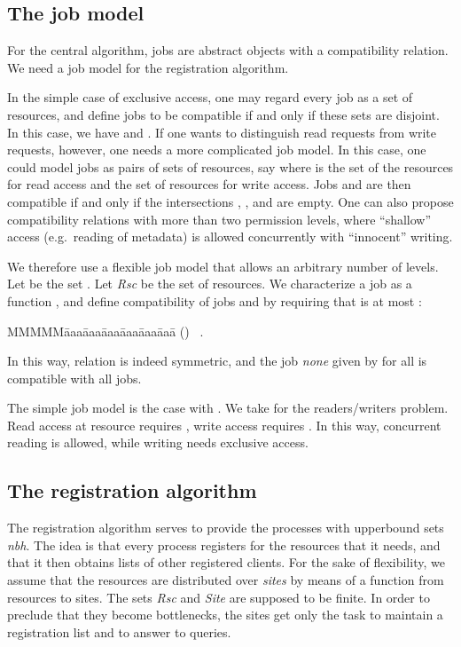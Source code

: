 \documentclass[10pt]{article} \usepackage[english]{babel}
\makeatletter
\def\refmystepcounter#1{\stepcounter{#1}\protect\gdef 
\@currentlabel {\csname p@#1\endcsname \csname 
the#1\endcsname}}
\newcounter {tabnr}
\newenvironment{tabn}{\begin{tabbing}
\refmystepcounter{tabnr}
MMMMM\=aaa\=aaa\=aaa\=aaa\=aaa\=aaa\= \kill
(\arabic{tabnr})~}{\end{tabbing}}
\def\S #1/{\mbox {\textsl{#1}}}
\makeatother
\begin{document}
\subsection{The job model} \label {jobmodel}

For the central algorithm, jobs are abstract objects with a
compatibility relation. We need a job model for the registration
algorithm.

In the simple case of exclusive access, one may regard every job as a
set of resources, and define jobs to be compatible if and only if
these sets are disjoint.  In this case, we have  and .  If one wants to distinguish
read requests from write requests, however, one needs a more
complicated job model.  In this case, one could model jobs as pairs of
sets of resources, say  where  is the set of the resources
for read access and  the set of resources for write access.  Jobs
 and  are then compatible if and only if the
intersections , , and  are
empty.  One can also propose compatibility relations with more than
two permission levels, where ``shallow'' access (e.g.\ reading of
metadata) is allowed concurrently with ``innocent'' writing.

We therefore use a flexible job model that allows an arbitrary number
 of levels.  Let  be the set .  Let \S Rsc/ be the set of resources. We characterize a job
 as a function , and define compatibility of
jobs  and  by requiring that  is at most :
\begin{tabn} \label{defCompatible}
\>  .
\end{tabn}
In this way, relation  is indeed symmetric, and the job \S none/
given by  for all  is compatible with all jobs.

The simple job model is the case with .  We take  for the
readers/writers problem. Read access at resource  requires , write access requires .  In this way, concurrent
reading is allowed, while writing needs exclusive access.

\subsection{The registration algorithm} \label{queryalg}

The registration algorithm serves to provide the processes with
upperbound sets \S nbh/.  The idea is that every process registers for
the resources that it needs, and that it then obtains lists of other
registered clients.  For the sake of flexibility, we assume that the
resources are distributed over \emph{sites} by means of a function  from resources to sites.  The sets \S Rsc/
and \S Site/ are supposed to be finite.  In order to preclude that
they become bottlenecks, the sites get only the task to maintain a
registration list and to answer to queries.
\end{document}
